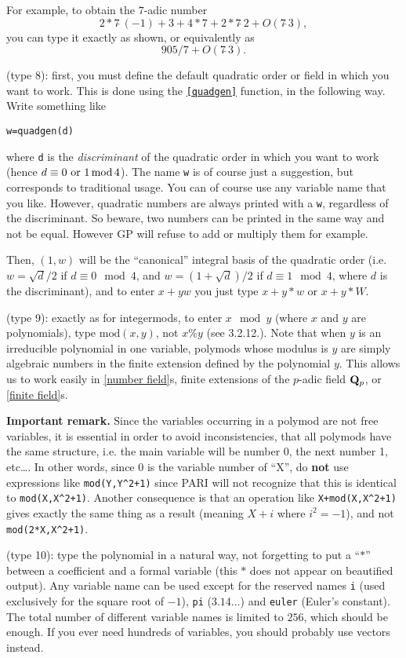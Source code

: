For example, to obtain the $7$-adic number
$$2*7\hat{\ }(-1)+3+4*7+2*7\hat{\ }2+O(7\hat{\ }3),$$ you can type it
exactly as shown, or equivalently as $$905/7+O(7\hat{\ }3).$$

 (type 8): first, you must define the default
quadratic order or field in which you want to work. This is done using the
{\tt \ref{quadgen}} function, in the following way. Write something like

\centerline{\tt w=quadgen(d)}

where {\tt d} is the {\sl discriminant} of the quadratic order in which you
want to work (hence $d\equiv 0{\rm\ or\ }1\mod 4$). The name {\tt w} is of course
just a suggestion, but corresponds to traditional usage. You can of course use
any variable name that you like.
However, quadratic numbers are always printed with a {\tt w},
regardless of the discriminant. So beware, two numbers can be printed in the same
way and not be equal. However GP will refuse to add or multiply them for example.

Then, $(1,w)$ will be the ``canonical'' integral basis of the quadratic order
(i.e. $w=\sqrt{d}/2$ if $d\equiv 0 \mod 4$, and $w=(1+\sqrt{d})/2$ if
$d\equiv 1 \mod 4$, where $d$ is the discriminant), and to enter $x+yw$ you
just type $x+y*w$ or $x+y*W$.

 (type 9): exactly as for integermods,
to enter $x \mod y$ (where $x$ and $y$ are polynomials), type
$\text{mod} ( x, y )$, not $x\% y$ (see 3.2.12.). Note that when $y$ is an
irreducible polynomial in one variable, polymods whose modulus is $y$ are 
simply algebraic numbers in the finite extension defined by the polynomial $y$.
This allows us to work easily in \ref{number field}s, finite extensions of 
the $p$-adic field $\Bbb Q_p$, or \ref{finite field}s.

{\bf Important remark.} Since the variables occurring in a polymod are not
free variables, it is essential in order to avoid inconsistencies, that
all polymods have the same structure, i.e. the main variable will be number 0,
the next number 1, etc\dots. In other words, since 0 is the variable number
of ``X'', do {\bf not} use expressions like {\tt mod(Y,Y\^{}2+1)} since PARI 
will not recognize that this is identical to {\tt mod(X,X\^{}2+1)}. Another 
consequence is that an operation like {\tt X+mod(X,X\^{}2+1)} gives exactly 
the same thing as a result (meaning $X+i$ where $i^2=-1$), and not 
{\tt mod(2*X,X\^{}2+1)}.

 (type 10): type the polynomial in a natural
way, not forgetting to put a ``$*$'' between a coefficient and a formal
variable (this $*$ does not appear on beautified output). Any variable name can be used
except for the reserved names {\tt i} (used exclusively for the square root
of $-1$), {\tt pi} ($3.14\dots$) and {\tt euler} (Euler's constant).
The total number of different variable names is limited to $256$, which
should be enough. If you ever need
hundreds of variables, you should probably use vectors instead.

